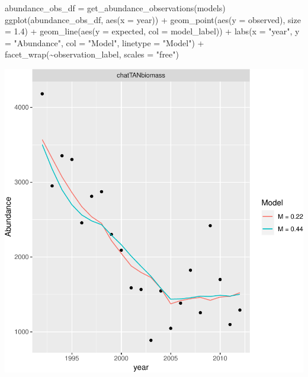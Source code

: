 \documentclass[
]{book}
\newenvironment{Shaded}{\begin{snugshade}}{\end{snugshade}}
\newcommand{\AttributeTok}[1]{\textcolor[rgb]{0.77,0.63,0.00}{#1}}
\newcommand{\FloatTok}[1]{\textcolor[rgb]{0.00,0.00,0.81}{#1}}
\newcommand{\FunctionTok}[1]{\textcolor[rgb]{0.00,0.00,0.00}{#1}}
\newcommand{\NormalTok}[1]{#1}
\newcommand{\OtherTok}[1]{\textcolor[rgb]{0.56,0.35,0.01}{#1}}
\newcommand{\SpecialCharTok}[1]{\textcolor[rgb]{0.00,0.00,0.00}{#1}}
\newcommand{\StringTok}[1]{\textcolor[rgb]{0.31,0.60,0.02}{#1}}
\begin{document}
\begin{Shaded}
\begin{Highlighting}[]
\NormalTok{abundance\_obs\_df }\OtherTok{=} \FunctionTok{get\_abundance\_observations}\NormalTok{(models)}
\FunctionTok{ggplot}\NormalTok{(abundance\_obs\_df, }\FunctionTok{aes}\NormalTok{(}\AttributeTok{x =}\NormalTok{ year)) }\SpecialCharTok{+}
  \FunctionTok{geom\_point}\NormalTok{(}\FunctionTok{aes}\NormalTok{(}\AttributeTok{y =}\NormalTok{ observed), }\AttributeTok{size =} \FloatTok{1.4}\NormalTok{) }\SpecialCharTok{+}
  \FunctionTok{geom\_line}\NormalTok{(}\FunctionTok{aes}\NormalTok{(}\AttributeTok{y =}\NormalTok{ expected, }\AttributeTok{col =}\NormalTok{ model\_label)) }\SpecialCharTok{+}
  \FunctionTok{labs}\NormalTok{(}\AttributeTok{x =} \StringTok{"year"}\NormalTok{, }\AttributeTok{y =} \StringTok{"Abundance"}\NormalTok{, }\AttributeTok{col =} \StringTok{"Model"}\NormalTok{, }\AttributeTok{linetype =} \StringTok{"Model"}\NormalTok{) }\SpecialCharTok{+}
  \FunctionTok{facet\_wrap}\NormalTok{(}\SpecialCharTok{\textasciitilde{}}\NormalTok{observation\_label, }\AttributeTok{scales =} \StringTok{"free"}\NormalTok{)}
\end{Highlighting}
\end{Shaded}

\includegraphics{_main_files/figure-latex/compare_abundance-1.pdf}
\end{document}
